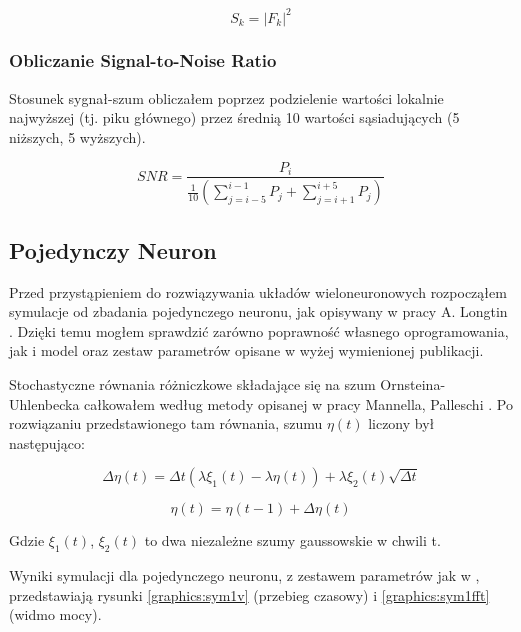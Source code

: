   \begin{equation}
    S_k = |F_k|^2
  \end{equation}

  \subsubsection{Obliczanie Signal-to-Noise Ratio}

  Stosunek sygnał-szum obliczałem poprzez podzielenie wartości lokalnie najwyższej (tj. piku głównego) przez średnią 10 wartości sąsiadujących (5 niższych, 5 wyższych).

  \begin{equation}
    SNR = \frac{P_i}{\frac{1}{10} \left ( \sum\limits^{i-1}_{j=i-5} P_j + \sum\limits^{i+5}_{j=i+1} P_j \right )}
  \end{equation}  
  
  \subsection{Pojedynczy Neuron}
  
  Przed przystąpieniem do rozwiązywania układów wieloneuronowych rozpocząłem symulacje od zbadania pojedynczego neuronu, jak opisywany w pracy A. Longtin \cite{longtin}. Dzięki temu mogłem sprawdzić zarówno poprawność własnego oprogramowania, jak i model oraz zestaw parametrów opisane w wyżej wymienionej publikacji.
  
  Stochastyczne równania różniczkowe składające się na szum Ornsteina-Uhlenbecka całkowałem według metody opisanej w pracy Mannella, Palleschi \cite{mannella}. Po rozwiązaniu przedstawionego tam równania, szumu $\eta (t)$ liczony był następująco:

  \begin{equation} \label{eq:deta:final}
    \Delta \eta(t) = \Delta t(\lambda \xi_1(t) - \lambda \eta(t)) + \lambda \xi_2(t) \sqrt{\Delta t}
  \end{equation}

  \begin{equation} \label{eq:eta:final}
    \eta(t) = \eta(t-1) + \Delta \eta(t)
  \end{equation}

  Gdzie $\xi_1(t)$, $\xi_2(t)$ to dwa niezależne szumy gaussowskie w chwili t.
  
  Wyniki symulacji dla pojedynczego neuronu, z zestawem parametrów jak w \cite{longtin}, przedstawiają rysunki \ref{graphics:sym1v} (przebieg czasowy) i \ref{graphics:sym1fft} (widmo mocy).
  
